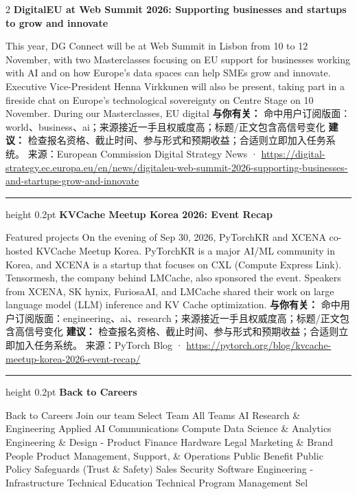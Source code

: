 \documentclass[10.5pt]{ctexart}
\begin{document}
\begin{multicols}{2}
{\large\bfseries DigitalEU at Web Summit 2026: Supporting businesses and startups to grow and innovate}\par
This year, DG Connect will be at Web Summit in Lisbon from 10 to 12 November, with two Masterclasses focusing on EU support for businesses working with AI and on how Europe’s data spaces can help SMEs grow and innovate. Executive Vice-President Henna Virkkunen will also be present, taking part in a fireside chat on Europe’s technological sovereignty on Centre Stage on 10 November. During our Masterclasses, EU digital
\textbf{与你有关：} 命中用户订阅版面：world、business、ai；来源接近一手且权威度高；标题/正文包含高信号变化
\textbf{建议：} 检查报名资格、截止时间、参与形式和预期收益；合适则立即加入任务系统。
{\footnotesize\color{ormuted} 来源：European Commission Digital Strategy News · \url{https://digital-strategy.ec.europa.eu/en/news/digitaleu-web-summit-2026-supporting-businesses-and-startups-grow-and-innovate}}
\vspace{2mm}
\hrule height 0.2pt
\vspace{2mm}
{\large\bfseries KVCache Meetup Korea 2026: Event Recap}\par
Featured projects On the evening of Sep 30, 2026, PyTorchKR and XCENA co-hosted KVCache Meetup Korea. PyTorchKR is a major AI/ML community in Korea, and XCENA is a startup that focuses on CXL (Compute Express Link). Tensormesh, the company behind LMCache, also sponsored the event. Speakers from XCENA, SK hynix, FuriosaAI, and LMCache shared their work on large language model (LLM) inference and KV Cache optimization.
\textbf{与你有关：} 命中用户订阅版面：engineering、ai、research；来源接近一手且权威度高；标题/正文包含高信号变化
\textbf{建议：} 检查报名资格、截止时间、参与形式和预期收益；合适则立即加入任务系统。
{\footnotesize\color{ormuted} 来源：PyTorch Blog · \url{https://pytorch.org/blog/kvcache-meetup-korea-2026-event-recap/}}
\vspace{2mm}
\hrule height 0.2pt
\vspace{2mm}
{\large\bfseries Back to Careers}\par
Back to Careers Join our team Select Team All Teams AI Research \& Engineering Applied AI Communications Compute Data Science \& Analytics Engineering \& Design - Product Finance Hardware Legal Marketing \& Brand People Product Management, Support, \& Operations Public Benefit Public Policy Safeguards (Trust \& Safety) Sales Security Software Engineering - Infrastructure Technical Education Technical Program Management Sel

\end{multicols}
\end{document}
